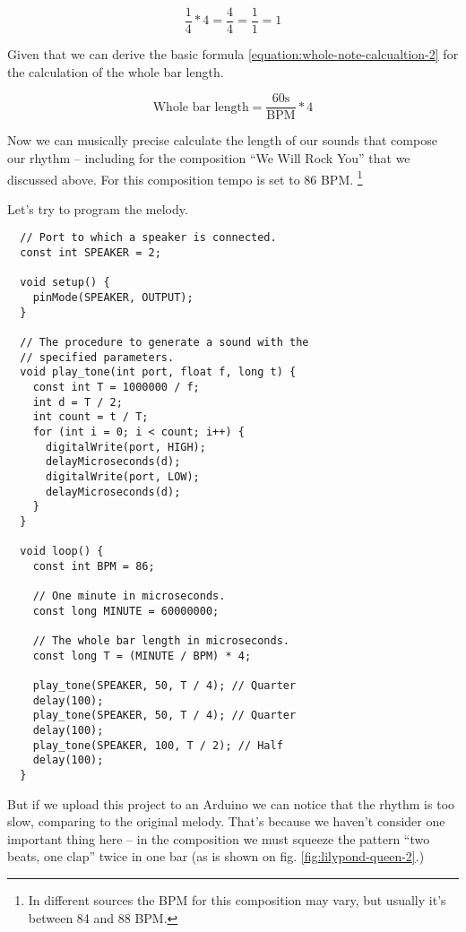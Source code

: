 \documentclass[../sparc.tex]{subfiles}
\begin{document}
\begin{equation}
  \frac{1}{4} * 4 = \frac{4}{4} = \frac{1}{1} = 1
  \label{equation:whole-note-calcualtion-1}
\end{equation}

Given that we can derive the basic formula
\ref{equation:whole-note-calcualtion-2} for the calculation of the whole bar
length.

\begin{equation}
  \mbox{Whole bar length} = \frac{60 \mbox{s}}{\mbox{BPM}} * 4
  \label{equation:whole-note-calcualtion-2}
\end{equation}

Now we can musically precise calculate the length of our sounds that compose our
rhythm -- including for the composition ``We Will Rock You'' that we discussed
above.  For this composition tempo is set to 86 BPM. \footnote{In different
sources the BPM for this composition may vary, but usually it's between 84 and
88 BPM.}

Let's try to program the melody.

\begin{verbatim}
  // Port to which a speaker is connected.
  const int SPEAKER = 2;

  void setup() {
    pinMode(SPEAKER, OUTPUT);
  }

  // The procedure to generate a sound with the
  // specified parameters.
  void play_tone(int port, float f, long t) {
    const int T = 1000000 / f;
    int d = T / 2;
    int count = t / T;
    for (int i = 0; i < count; i++) {
      digitalWrite(port, HIGH);
      delayMicroseconds(d);
      digitalWrite(port, LOW);
      delayMicroseconds(d);
    }
  }

  void loop() {
    const int BPM = 86;

    // One minute in microseconds.
    const long MINUTE = 60000000;

    // The whole bar length in microseconds.
    const long T = (MINUTE / BPM) * 4;

    play_tone(SPEAKER, 50, T / 4); // Quarter
    delay(100);
    play_tone(SPEAKER, 50, T / 4); // Quarter
    delay(100);
    play_tone(SPEAKER, 100, T / 2); // Half
    delay(100);
  }
\end{verbatim}

But if we upload this project to an Arduino we can notice that the rhythm is too
slow, comparing to the original melody.  That's because we haven't consider one
important thing here -- in the composition we must squeeze the pattern ``two
beats, one clap'' twice in one bar (as is shown on
fig. \ref{fig:lilypond-queen-2}.)
\end{document}

